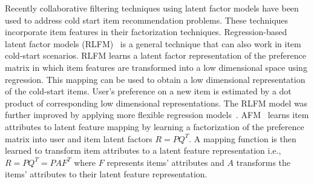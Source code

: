 Recently collaborative filtering techniques using latent
factor models have been used to address cold start item recommendation
problems. These techniques incorporate item features in their factorization
techniques. Regression-based latent factor models (RLFM)~\cite{agarwal09} is a
general technique that can also work in item cold-start scenarios. 
RLFM learns a latent factor representation of the preference matrix
in which item features are transformed into a low dimensional space using regression.
This mapping can be used to obtain a low dimensional representation of the cold-start
items. User's preference on a new item is estimated by a dot product of
corresponding low dimensional representations. The RLFM model was further
improved by applying more flexible regression models~\cite{zhangrecsys11}.
AFM~\cite{gantner10} learns item attributes to latent feature mapping
by learning a factorization of the preference matrix
into user and item latent factors $R = PQ^T$. A mapping function is then learned
to transform item attributes to a latent feature representation i.e., $R = PQ^T =
PAF^T$ where $F$ represents items' attributes and $A$ transforms the items' attributes 
to their latent feature representation. 


\iffalse
\CFLINEXP (\CFLIN)~\cite{elbadrawy2015} learns a personalized user
model by using historical preferences from all users across the dataset. In
this model for each user an item similarity function is learned, which is a
linear combination of user-independent similarity functions known as
\textit{global similarity functions}. Along with these global similarity
functions, for each user a personalized linear combination of these global
similarity functions is learned. It is shown to outperform both RLFM and AFM
methods in cold-start \TOPN item recommendations.
\fi


